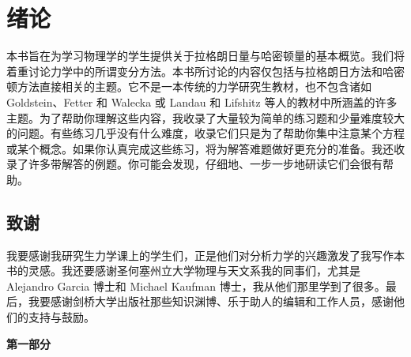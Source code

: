 \chapter{绪论}
\label{ch:intro}

本书旨在为学习物理学的学生提供关于拉格朗日量与哈密顿量的基本概览。我们将着重讨论力学中的所谓变分方法。本书所讨论的内容仅包括与拉格朗日方法和哈密顿方法直接相关的主题。它不是一本传统的力学研究生教材，也不包含诸如 Goldstein、Fetter 和 Walecka 或 Landau 和 Lifshitz 等人的教材中所涵盖的许多主题。为了帮助你理解这些内容，我收录了大量较为简单的练习题和少量难度较大的问题。有些练习几乎没有什么难度，收录它们只是为了帮助你集中注意某个方程或某个概念。如果你认真完成这些练习，将为解答难题做好更充分的准备。我还收录了许多带解答的例题。你可能会发现，仔细地、一步一步地研读它们会很有帮助。

\section*{致谢}

我要感谢我研究生力学课上的学生们，正是他们对分析力学的兴趣激发了我写作本书的灵感。我还要感谢圣何塞州立大学物理与天文系我的同事们，尤其是 Alejandro Garcia 博士和 Michael Kaufman 博士，我从他们那里学到了很多。最后，我要感谢剑桥大学出版社那些知识渊博、乐于助人的编辑和工作人员，感谢他们的支持与鼓励。

\null\clearpage
\begin{center}
{\Large\bfseries 第一部分}
\end{center}
